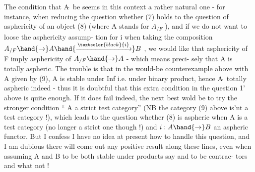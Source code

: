 The condition that A$\hat{\ }$ be \hand{\uline{\textcolor{black}{totally aspheric}}}  seems in this context a
rather natural one  -  for instance,  when reducing the question whether
(7)  holds to the question of asphericity of an object (8) (where A stands
for  $A_{/F}$  ),  and if we do not want to loose the  asphericity assump-%
tion for i when taking the composition  $A_{/F} \hand{\to} A \hand{\xrightarrow{\textcolor{black}{i}}} B$ , we would like
that asphericity of F imply asphericity of $A_{/F} \hand{\to} A$  -  which means preci-%
sely that A is totally aspheric.  The trouble is that in the would-be
counterexample above with A given by (9),  A is stable under Inf  i.e.
under binary product,  hence A$\hat{\ }$ \hand{\uline{\textcolor{black}{is}}}  totally aspheric indeed  -  thus it
is doubtful that this extra condition in the question 1' above is
quite enough.  If it does fail indeed,  the next best wold be to 
try the stronger condition `` A a strict test category''  (NB the category
(9) above is'nt a test category !),  which leads to the question whether
(8) is aspheric when A is a test category (no longer a strict one
though !)  and  $i : A \hand{\to} B$ an aspheric functor.   But I confess I have
no idea at present how to handle this question,  and I am dubious there
will come out any positive result along these lines,  even when assuming
A and B to be both stable under  products  say\hand{,} and to be contrac-%
tors and what not !

